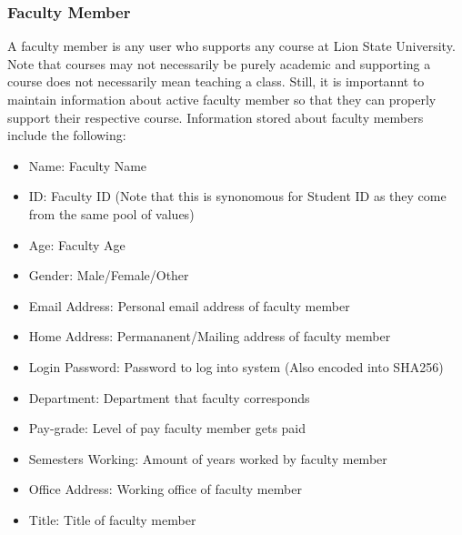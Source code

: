 \documentclass{article}
\begin{document}
    \subsubsection{Faculty Member}\label{sec:Requirements:Users:Faculty}
      A faculty member is any user who supports any course at Lion State University.  Note that courses may not necessarily be purely academic and supporting a course does not necessarily mean teaching a class.  Still, it is importannt to maintain information about active faculty member so that they can properly support their respective course.  Information stored about faculty members include the following:
      \begin{itemize}
        \item Name: Faculty Name
        \item ID: Faculty ID (Note that this is synonomous for Student ID as they come from the same pool of values)
        \item Age: Faculty Age
        \item Gender: Male/Female/Other
        \item Email Address: Personal email address of faculty member
        \item Home Address: Permananent/Mailing address of faculty member
        \item Login Password: Password to log into system (Also encoded into SHA256)
        \item Department: Department that faculty corresponds
        \item Pay-grade: Level of pay faculty member gets paid
        \item Semesters Working: Amount of years worked by faculty member
        \item Office Address: Working office of faculty member
        \item Title: Title of faculty member
      \end{itemize}
\end{document}
